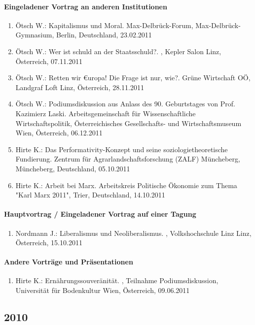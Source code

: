 \paragraph{Eingeladener Vortrag an anderen Institutionen}
\begin{enumerate}
	\item Ötsch W.: Kapitalismus und Moral. Max-Delbrück-Forum, Max-Delbrück-Gymnasium, Berlin, Deutschland, 23.02.2011
	\item Ötsch W.: Wer ist schuld an der Staatsschuld?. , Kepler Salon Linz, Österreich, 07.11.2011
	\item Ötsch W.: Retten wir €uropa! Die Frage ist nur, wie?. Grüne Wirtschaft OÖ, Landgraf Loft Linz, Österreich, 28.11.2011
	\item Ötsch W.: Podiumsdiskussion aus Anlass des 90. Geburtstages von Prof. Kazimierz Laski. Arbeitsgemeinschaft für Wissenschaftliche Wirtschaftspolitik, Österreichisches Gesellschafts- und Wirtschaftsmuseum Wien, Österreich, 06.12.2011
	\item Hirte K.: Das Performativity-Konzept und seine soziologietheoretische Fundierung. Zentrum für Agrarlandschaftsforschung (ZALF) Müncheberg, Müncheberg, Deutschland, 05.10.2011
	\item Hirte K.: Arbeit bei Marx. Arbeitskreis Politische Ökonomie zum Thema "Karl Marx 2011", Trier, Deutschland, 14.10.2011
\end{enumerate}
\paragraph{Hauptvortrag / Eingeladener Vortrag auf einer Tagung}
\begin{enumerate}
	\item Nordmann J.: Liberalismus und Neoliberalismus. , Volkshochschule Linz Linz, Österreich, 15.10.2011
\end{enumerate}
\paragraph{Andere Vorträge und Präsentationen}
\begin{enumerate}
	\item Hirte K.: Ernährungssouveränität. , Teilnahme Podiumsdiskussion, Universität für Bodenkultur Wien, Österreich, 09.06.2011
\end{enumerate}
\subsection*{2010}

